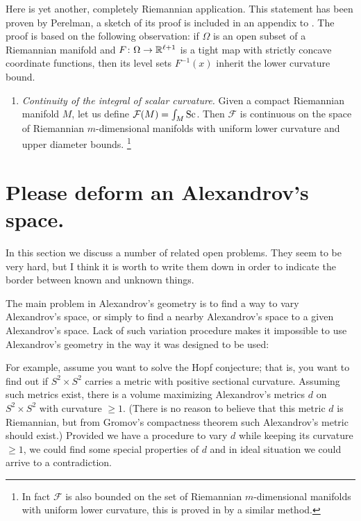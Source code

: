 \documentclass{article}
\begin{document}
Here is yet another, completely Riemannian application. This statement has been
proven by Perelman, a sketch of its proof is included in an appendix to
\cite{petrunin:PL}.
The proof is based on the following observation: if $\Omega$ is an open subset of a Riemannian manifold and  $F\colon\Omega\to\mathbb{R}^{\ell+1}$ is a tight map with strictly concave coordinate functions, then its level sets $F^{-1}(x)$ inherit the lower curvature bound. 
\begin{enumerate}[$\diamond$]
\item \emph{Continuity of the integral of scalar curvature.} 
Given  a compact Riemannian manifold $M$, let us define $\mathcal F(M)=\int_M\operatorname{Sc}$. 
Then $\mathcal F$ is continuous on the space of Riemannian
$m$-dimensional manifolds with uniform lower curvature and upper diameter
bounds.%
\footnote{In fact $\mathcal F$ is also bounded on the set of Riemannian
$m$-dimensional manifolds with uniform lower curvature, this is proved in
\cite{petrunin:scalar} by a similar method.}
\end{enumerate}















\section{Please deform an Alexandrov's space.}
\setcounter{subsection}{1}

In this section we discuss a number of related open problems. 
They seem to be very hard, but I think it is worth to
write them down in order to indicate the border between known and unknown things.

The main problem in Alexandrov's geometry is to find a way to vary Alexandrov's
space, or simply to find a nearby Alexandrov's space to a given Alexandrov's
space. 
Lack of such variation procedure makes it impossible to use Alexandrov's
geometry in the way it was designed to be used: 

For example, assume you want to solve the Hopf conjecture;
that is, you want to find out
if $S^2\times S^2$ carries a metric with positive sectional curvature. 
Assuming such metrics exist, 
there is a volume maximizing Alexandrov's metrics $d$
on $S^2\times S^2$ with curvature $\ge 1$.
(There is no reason to believe
that this metric $d$ is Riemannian, but from Gromov's compactness theorem such
Alexandrov's metric should exist.)
Provided we have a procedure to vary $d$ while keeping its curvature $\ge 1$,
we could find some special properties of $d$  and in ideal situation we could arrive to a contradiction.
\end{document}

